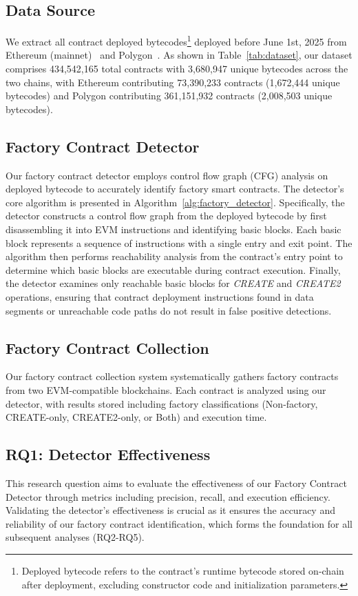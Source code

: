 \documentclass[acmsmall, screen]{acmart}
\begin{document}
	\subsection{Data Source}
	We extract all contract deployed bytecodes\footnote{Deployed bytecode refers to the contract's
	runtime bytecode stored on-chain after deployment, excluding constructor code and initialization
	parameters.} deployed before June 1st, 2025 from Ethereum (mainnet)~\cite{ethereum} and Polygon~\cite{polygon}.
	As shown in Table~\ref{tab:dataset}, our dataset comprises 434,542,165 total contracts with 3,680,947
	unique bytecodes across the two chains, with Ethereum contributing 73,390,233 contracts (1,672,444
	unique bytecodes) and Polygon contributing 361,151,932 contracts (2,008,503 unique bytecodes).

	

	\subsection{Factory Contract Detector}
	Our factory contract detector employs control flow graph (CFG) analysis on deployed bytecode to
	accurately identify factory smart contracts. The detector's core algorithm is presented in Algorithm~\ref{alg:factory_detector}.
	Specifically, the detector constructs a control flow graph from the deployed bytecode by first disassembling
	it into EVM instructions and identifying basic blocks. Each basic block represents a sequence of
	instructions with a single entry and exit point. The algorithm then performs reachability analysis
	from the contract's entry point to determine which basic blocks are executable during contract execution.
	Finally, the detector examines only reachable basic blocks for \textit{CREATE} and \textit{CREATE2}
	operations, ensuring that contract deployment instructions found in data segments or unreachable
	code paths do not result in false positive detections.

	\subsection{Factory Contract Collection}
	Our factory contract collection system systematically gathers factory contracts from two EVM-compatible
	blockchains. Each contract is analyzed using our detector, with results stored including factory
	classifications (Non-factory, CREATE-only, CREATE2-only, or Both) and execution time.

	\subsection{RQ1: Detector Effectiveness}
	This research question aims to evaluate the effectiveness of our Factory Contract Detector through
	metrics including precision, recall, and execution efficiency. Validating the detector's
	effectiveness is crucial as it ensures the accuracy and reliability of our factory contract
	identification, which forms the foundation for all subsequent analyses (RQ2-RQ5).
\end{document}
